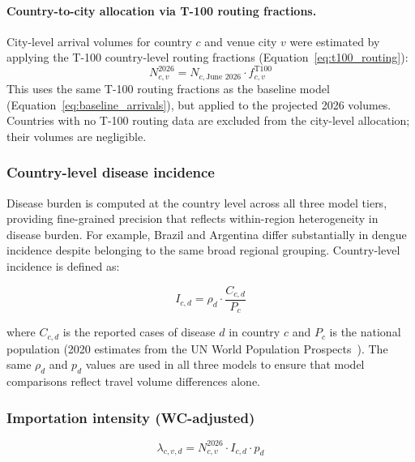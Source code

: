 \documentclass[12pt]{article}
\begin{document}
\paragraph{Country-to-city allocation via T-100 routing fractions.}
City-level arrival volumes for country $c$ and venue city $v$ were
estimated by applying the T-100 country-level routing fractions
(Equation~\ref{eq:t100_routing}):
\begin{equation}
  N_{c,v}^{2026} = N_{c,\text{June 2026}} \cdot f_{c,v}^{\text{T100}}
  \label{eq:routing_wc}
\end{equation}
This uses the same T-100 routing fractions as the baseline model
(Equation~\ref{eq:baseline_arrivals}), but applied to the projected
2026 volumes. Countries with no T-100 routing data are excluded from
the city-level allocation; their volumes are negligible.

\subsubsection*{Country-level disease incidence}

Disease burden is computed at the country level across all three
model tiers, providing fine-grained precision that reflects
within-region heterogeneity in disease burden. For example, Brazil
and Argentina differ substantially in dengue incidence despite
belonging to the same broad regional grouping. Country-level
incidence is defined as:

\begin{equation}
  I_{c,d} = \rho_d \cdot \frac{C_{c,d}}{P_c}
  \label{eq:country_inc}
\end{equation}

where $C_{c,d}$ is the reported cases of disease $d$ in country $c$
and $P_c$ is the national population (2020 estimates from the UN
World Population Prospects~\cite{PopUN2020}). The same $\rho_d$ and
$p_d$
values are used in all three models to ensure that model comparisons
reflect travel volume differences alone.

\subsubsection*{Importation intensity (WC-adjusted)}

\begin{equation}
  \lambda_{c,v,d} = N_{c,v}^{2026} \cdot I_{c,d} \cdot p_d
  \label{eq:lambda_wc}
\end{equation}
\end{document}
